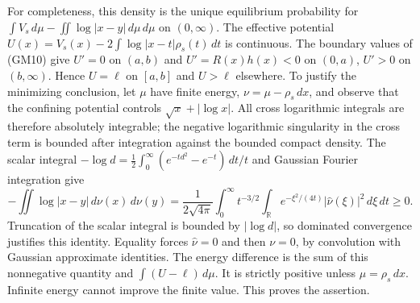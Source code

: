 \documentclass[11pt]{article}
\newcommand{\dd}{\,d}\newcommand{\R}{\mathbb R}
\begin{document}
For completeness, this density is the unique equilibrium probability
for $\int V_s\dd\mu-\iint\log|x-y|\dd\mu\dd\mu$ on $(0,\infty)$.
The effective potential
$U(x)=V_s(x)-2\int\log|x-t|\rho_s(t)\dd t$ is continuous.
The boundary values of (GM10) give $U'=0$ on $(a,b)$ and
$U'=R(x)h(x)<0$ on $(0,a)$, $U'>0$ on $(b,\infty)$.
Hence $U=\ell$ on $[a,b]$ and $U>\ell$ elsewhere.
To justify the minimizing conclusion, let $\mu$ have finite energy,
$\nu=\mu-\rho_s\dd x$, and observe that the confining potential
controls $\sqrt x+|\log x|$. All cross logarithmic integrals are therefore
absolutely integrable; the negative logarithmic singularity in the cross
term is bounded after integration against the bounded compact density.
The scalar integral
$-\log d=\tfrac12\int_0^\infty(e^{-td^2}-e^{-t})\dd t/t$
and Gaussian Fourier integration give
\[
 -\iint\log|x-y|\dd\nu(x)\dd\nu(y)
 =\frac1{2\sqrt{4\pi}}\int_0^\infty t^{-3/2}
       \int_\R e^{-\xi^2/(4t)}|\widehat\nu(\xi)|^2\dd\xi\dd t\ge0.
\]
Truncation of the scalar integral is bounded by $|\log d|$, so dominated
convergence justifies this identity. Equality forces $\widehat\nu=0$ and
then $\nu=0$, by convolution with Gaussian approximate identities.
The energy difference is the sum of this nonnegative quantity and
$\int(U-\ell)\dd\mu$. It is strictly positive unless $\mu=\rho_s\dd x$.
Infinite energy cannot improve the finite value. This proves the assertion.
\end{document}
